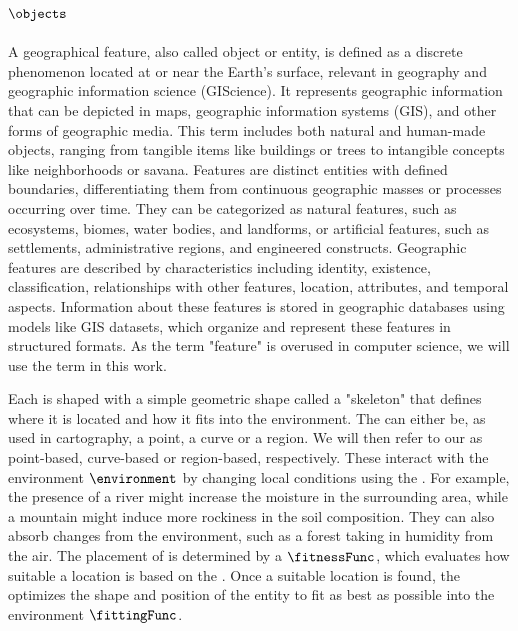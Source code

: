 \subsection{ $\objects$}
\label{sec:semantic-representation_environmental-objects}
A geographical feature, also called object or entity, is defined as a discrete phenomenon located at or near the Earth's surface, relevant in geography and geographic information science (GIScience). It represents geographic information that can be depicted in maps, geographic information systems (GIS), and other forms of geographic media. This term includes both natural and human-made objects, ranging from tangible items like buildings or trees to intangible concepts like neighborhoods or savana. Features are distinct entities with defined boundaries, differentiating them from continuous geographic masses or processes occurring over time. They can be categorized as natural features, such as ecosystems, biomes, water bodies, and landforms, or artificial features, such as settlements, administrative regions, and engineered constructs. Geographic features are described by characteristics including identity, existence, classification, relationships with other features, location, attributes, and temporal aspects. Information about these features is stored in geographic databases using models like GIS datasets, which organize and represent these features in structured formats. As the term "feature" is overused in computer science, we will use the term  in this work.

Each  is shaped with a simple geometric shape called a "skeleton" that defines where it is located and how it fits into the environment. The  can either be, as used in cartography, a point, a curve or a region. We will then refer to our  as point-based, curve-based or region-based, respectively.  
These  interact with the environment $\environment$ by changing local conditions using the . For example, the presence of a river might increase the moisture in the surrounding area, while a mountain might induce more rockiness in the soil composition. They can also absorb changes from the environment, such as a forest taking in humidity from the air.
The placement of  is determined by a  $\fitnessFunc$, which evaluates how suitable a location is based on the . Once a suitable location is found, the  optimizes the shape and position of the entity to fit as best as possible into the environment $\fittingFunc$.


